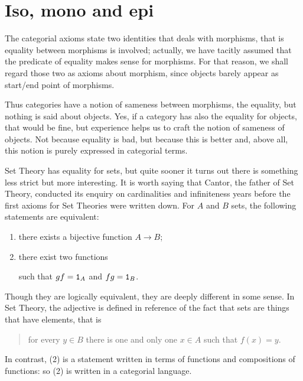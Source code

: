 
\section{Iso, mono and epi}


The categorial axioms state two identities that deals with morphisms, that is equality between morphisms is involved; actually, we have tacitly assumed that the predicate of equality makes sense for morphisms. For that reason, we shall regard those two as axioms about morphism, since objects barely appear as start/end point of morphisms.

Thus categories have a notion of sameness between morphisms, the equality, but nothing is said about objects. Yes, if a category has also the equality for objects, that would be fine, but experience helps us to craft the  notion of sameness of objects. Not because equality is bad, but because this is better and, above all, this notion is purely expressed in categorial terms.

\begin{example}
Set Theory has equality for sets, but quite sooner it turns out there is something less strict but more interesting. It is worth saying that Cantor, the father of Set Theory, conducted its enquiry on cardinalities and infiniteness years before the first axioms for Set Theories were written down. For \(A\) and \(B\) sets, the following statements are equivalent:
\begin{enumerate}
\item there exists a bijective function \(A \to B\);
\item there exist two functions
such that \(g f = \mathtt 1_A\) and \(fg = \mathtt 1_B\).
\end{enumerate}
Though they are logically equivalent, they are deeply different in some sense. In Set Theory, the adjective  is defined in reference of the fact that sets are things that have elements, that is
\begin{quotation}
for every \(y \in B\) there is one and only one \(x \in A\) such that \(f(x) = y\).
\end{quotation}
In contrast, (2) is a statement written in terms of functions and compositions of functions: so (2) is written in a categorial language.
\end{example}

